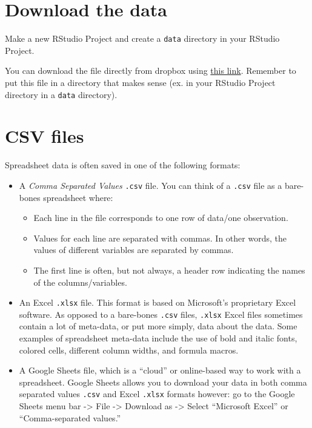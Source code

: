 \documentclass[
]{book}
\providecommand{\tightlist}{%
  \setlength{\itemsep}{0pt}\setlength{\parskip}{0pt}}
\begin{document}
\hypertarget{download-the-data}{%
\section{Download the data}\label{download-the-data}}

Make a new RStudio Project and create a \texttt{data} directory in your RStudio Project.

You can download the file directly from dropbox using \href{https://www.dropbox.com/sh/pegir6j09mq7sia/AACQO9BnNAEl4EofAhmyqjmXa?dl=0}{this link}. Remember to put this file in a directory that makes sense (ex. in your RStudio Project directory in a \texttt{data} directory).

\hypertarget{csv-files}{%
\section{CSV files}\label{csv-files}}

Spreadsheet data is often saved in one of the following formats:

\begin{itemize}
\tightlist
\item
  A \emph{Comma Separated Values} \texttt{.csv} file. You can think of a \texttt{.csv} file as a bare-bones spreadsheet where:

  \begin{itemize}
  \tightlist
  \item
    Each line in the file corresponds to one row of data/one observation.\\
  \item
    Values for each line are separated with commas. In other words, the values of different variables are separated by commas.\\
  \item
    The first line is often, but not always, a header row indicating the names of the columns/variables.\\
  \end{itemize}
\item
  An Excel \texttt{.xlsx} file. This format is based on Microsoft's proprietary Excel software. As opposed to a bare-bones \texttt{.csv} files, \texttt{.xlsx} Excel files sometimes contain a lot of meta-data, or put more simply, data about the data. Some examples of spreadsheet meta-data include the use of bold and italic fonts, colored cells, different column widths, and formula macros.\\
\item
  A Google Sheets file, which is a ``cloud'' or online-based way to work with a spreadsheet. Google Sheets allows you to download your data in both comma separated values \texttt{.csv} and Excel \texttt{.xlsx} formats however: go to the Google Sheets menu bar -\textgreater{} File -\textgreater{} Download as -\textgreater{} Select ``Microsoft Excel'' or ``Comma-separated values.''
\end{itemize}
\end{document}
